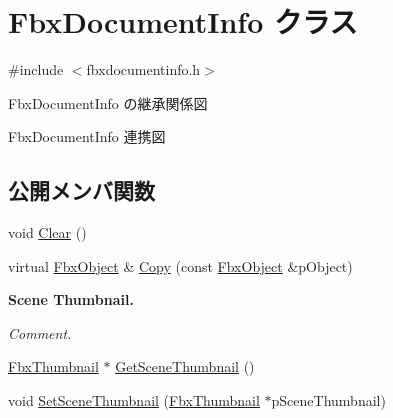 \hypertarget{class_fbx_document_info}{}\section{Fbx\+Document\+Info クラス}
\label{class_fbx_document_info}


{\ttfamily \#include $<$fbxdocumentinfo.\+h$>$}



Fbx\+Document\+Info の継承関係図


Fbx\+Document\+Info 連携図
\subsection*{公開メンバ関数}
\begin{DoxyCompactItemize}
\item 
void \hyperlink{class_fbx_document_info_a6a372ab1bf0c0e5452230a42c21f0d23}{Clear} ()
\item 
virtual \hyperlink{class_fbx_object}{Fbx\+Object} \& \hyperlink{class_fbx_document_info_ad8433a67149f705181ae78d29f6d99fe}{Copy} (const \hyperlink{class_fbx_object}{Fbx\+Object} \&p\+Object)
\end{DoxyCompactItemize}
\begin{Indent}\textbf{ Scene Thumbnail.}\par
{\em Comment. }\begin{DoxyCompactItemize}
\item 
\hyperlink{class_fbx_thumbnail}{Fbx\+Thumbnail} $\ast$ \hyperlink{class_fbx_document_info_a07a315ce1aaf25dd72035edc0f548d70}{Get\+Scene\+Thumbnail} ()
\item 
void \hyperlink{class_fbx_document_info_ab9498e580c68b5ec5aa38bfe4c4f6123}{Set\+Scene\+Thumbnail} (\hyperlink{class_fbx_thumbnail}{Fbx\+Thumbnail} $\ast$p\+Scene\+Thumbnail)
\end{DoxyCompactItemize}
\end{Indent}
